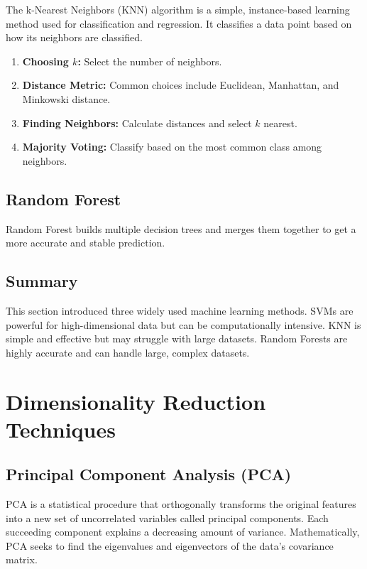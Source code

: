 The k-Nearest Neighbors (KNN) algorithm is a simple, instance-based learning method used for classification and regression. It classifies a data point based on how its neighbors are classified.

\begin{enumerate}
  \item \textbf{Choosing $k$:} Select the number of neighbors.
  \item \textbf{Distance Metric:} Common choices include Euclidean, Manhattan, and Minkowski distance.
  \item \textbf{Finding Neighbors:} Calculate distances and select $k$ nearest.
  \item \textbf{Majority Voting:} Classify based on the most common class among neighbors.
\end{enumerate}

\subsection{Random Forest}

Random Forest builds multiple decision trees and merges them together to get a more accurate and stable prediction.

\subsection{Summary}

This section introduced three widely used machine learning methods. SVMs are powerful for high-dimensional data but can be computationally intensive. KNN is simple and effective but may struggle with large datasets. Random Forests are highly accurate and can handle large, complex datasets.


\section{Dimensionality Reduction Techniques}
\label{sec:dim-reduction}

\subsection{Principal Component Analysis (PCA)}

PCA is a statistical procedure that orthogonally transforms the original features into a new set of uncorrelated variables called principal components. Each succeeding component explains a decreasing amount of variance. Mathematically, PCA seeks to find the eigenvalues and eigenvectors of the data's covariance matrix.

